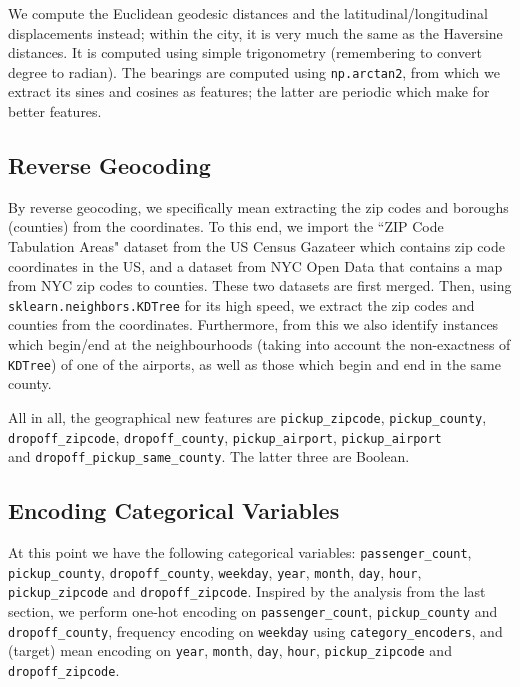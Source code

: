 \documentclass[12pt,letterpaper,final]{article}
\numberwithin{equation}{section}
\begin{document}
We compute the Euclidean geodesic distances and the latitudinal/longitudinal displacements instead; within the city, it is very much the same as the Haversine distances. It is computed using simple trigonometry (remembering to convert degree to radian). The bearings are computed using \verb|np.arctan2|, from which we extract its sines and cosines as features; the latter are periodic which make for better features.

\subsection{Reverse Geocoding}

By reverse geocoding, we specifically mean extracting the zip codes and boroughs (counties) from the coordinates. To this end, we import the ``ZIP Code Tabulation Areas" dataset from the US Census Gazateer which contains zip code coordinates in the US, and a dataset from NYC Open Data that contains a map from NYC zip codes to counties. These two datasets are first merged. Then, using \verb|sklearn.neighbors.KDTree| for its high speed, we extract the zip codes and counties from the coordinates. Furthermore, from this we also identify instances which begin/end at the neighbourhoods (taking into account the non-exactness of \verb|KDTree|) of one of the airports, as well as those which begin and end in the same county.

All in all, the geographical new features are \verb|pickup_zipcode|, \verb|pickup_county|, \\\verb|dropoff_zipcode|, \verb|dropoff_county|, \verb|pickup_airport|, \verb|pickup_airport| \\and \verb|dropoff_pickup_same_county|. The latter three are Boolean.

\subsection{Encoding Categorical Variables}
At this point we have the following categorical variables: \verb|passenger_count|, \verb|pickup_county|, \verb|dropoff_county|, \verb|weekday|, \verb|year|, \verb|month|, \verb|day|, \verb|hour|, \verb|pickup_zipcode| and \verb|dropoff_zipcode|. Inspired by the analysis from the last section, we perform one-hot encoding on \verb|passenger_count|, \verb|pickup_county| and \verb|dropoff_county|, frequency encoding on \verb|weekday| using \verb|category_encoders|, and (target) mean encoding on \verb|year|, \verb|month|, \verb|day|, \verb|hour|, \verb|pickup_zipcode| and \verb|dropoff_zipcode|.
\end{document}
